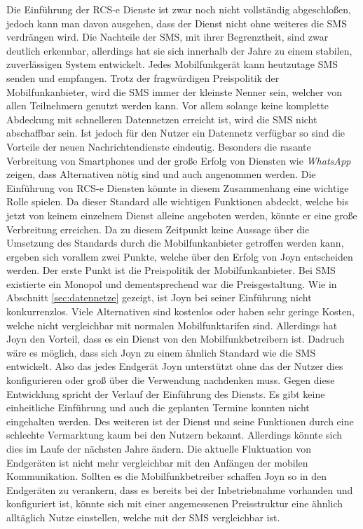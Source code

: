 \documentclass[german,12pt,a4paper]{article}
\begin{document}
Die Einführung der RCS-e Dienste ist zwar noch nicht vollständig abgeschloßen, jedoch
kann man davon ausgehen, dass der Dienst nicht ohne weiteres die SMS verdrängen wird. Die
Nachteile der SMS, mit ihrer Begrenztheit, sind zwar deutlich erkennbar, allerdings hat sie sich innerhalb
der Jahre zu einem stabilen, zuverlässigen System entwickelt. Jedes Mobilfunkgerät kann
heutzutage SMS senden und empfangen. Trotz der fragwürdigen Preispolitik der Mobilfunkanbieter,
wird die SMS immer der kleinste Nenner sein, welcher von allen Teilnehmern genutzt werden kann.
Vor allem solange keine komplette Abdeckung mit schnelleren Datennetzen erreicht ist, wird die
SMS nicht abschaffbar sein. Ist jedoch für den Nutzer ein Datennetz verfügbar so sind die
Vorteile der neuen Nachrichtendienste eindeutig. Besonders die rasante Verbreitung von
Smartphones und der große Erfolg von Diensten wie \textit{WhatsApp} zeigen, dass
Alternativen nötig sind und auch angenommen werden. Die Einführung von RCS-e Diensten könnte in
diesem Zusammenhang eine wichtige Rolle spielen. Da dieser Standard alle wichtigen Funktionen
abdeckt, welche bis jetzt von keinem einzelnem Dienst alleine angeboten werden, könnte er eine große
Verbreitung erreichen. Da zu diesem Zeitpunkt keine Aussage über die Umsetzung des Standards
durch die Mobilfunkanbieter getroffen werden kann, ergeben sich vorallem zwei Punkte, welche über
den Erfolg von Joyn entscheiden werden. Der erste Punkt ist die Preispolitik der
Mobilfunkanbieter. Bei SMS existierte ein Monopol und dementsprechend war die Preisgestaltung. Wie
in Abschnitt \ref{sec:datennetze} gezeigt, ist Joyn bei seiner Einführung nicht konkurrenzlos.
Viele Alternativen sind kostenlos oder haben sehr geringe Kosten, welche nicht vergleichbar mit
normalen Mobilfunktarifen sind. Allerdings hat Joyn den Vorteil, dass es ein Dienst von den
Mobilfunkbetreibern ist. Dadruch wäre es möglich, dass sich Joyn zu einem ähnlich Standard wie die
SMS entwickelt. Also das jedes Endgerät Joyn unterstützt ohne das der Nutzer
dies konfigurieren oder groß über die Verwendung nachdenken muss. Gegen diese
Entwicklung spricht der Verlauf der Einführung des Diensts. Es gibt keine einheitliche Einführung und auch
die geplanten Termine konnten nicht eingehalten werden. Des weiteren ist der Dienst und seine
Funktionen  durch eine schlechte Vermarktung kaum bei den Nutzern bekannt. Allerdings
könnte sich dies im Laufe der nächsten Jahre ändern. Die aktuelle Fluktuation von Endgeräten
ist nicht mehr vergleichbar mit den Anfängen der mobilen Kommunikation. Sollten es die
Mobilfunkbetreiber schaffen Joyn so in den Endgeräten zu verankern, dass es bereits bei der
Inbetriebnahme vorhanden und konfiguriert ist, könnte sich mit einer angemessenen Preisstruktur
eine ähnlich alltäglich Nutze einstellen, welche mit der SMS vergleichbar ist.


\clearpage


\end{document}
